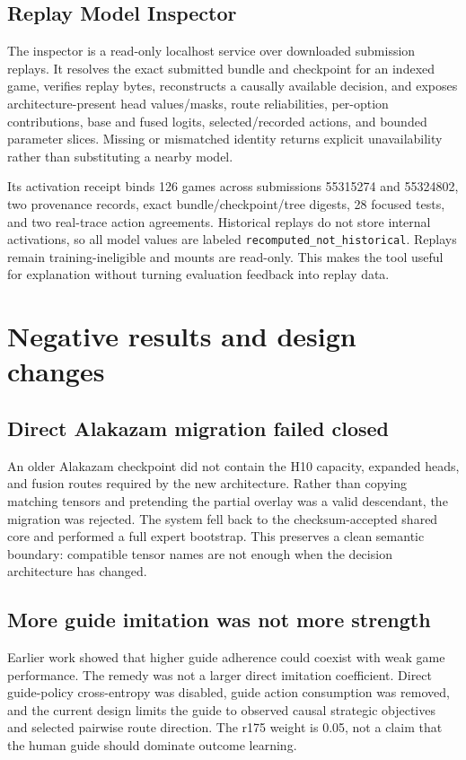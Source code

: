 \documentclass[10pt]{article}
\begin{document}
\subsection{Replay Model Inspector}

The inspector is a read-only localhost service over downloaded submission replays. It resolves the exact submitted bundle and checkpoint for an indexed game, verifies replay bytes, reconstructs a causally available decision, and exposes architecture-present head values/masks, route reliabilities, per-option contributions, base and fused logits, selected/recorded actions, and bounded parameter slices. Missing or mismatched identity returns explicit unavailability rather than substituting a nearby model.

Its activation receipt binds 126 games across submissions 55315274 and 55324802, two provenance records, exact bundle/checkpoint/tree digests, 28 focused tests, and two real-trace action agreements. Historical replays do not store internal activations, so all model values are labeled \texttt{recomputed\_not\_historical}. Replays remain training-ineligible and mounts are read-only. This makes the tool useful for explanation without turning evaluation feedback into replay data.

\section{Negative results and design changes}

\subsection{Direct Alakazam migration failed closed}

An older Alakazam checkpoint did not contain the H10 capacity, expanded heads, and fusion routes required by the new architecture. Rather than copying matching tensors and pretending the partial overlay was a valid descendant, the migration was rejected. The system fell back to the checksum-accepted shared core and performed a full expert bootstrap. This preserves a clean semantic boundary: compatible tensor names are not enough when the decision architecture has changed.

\subsection{More guide imitation was not more strength}

Earlier work showed that higher guide adherence could coexist with weak game performance. The remedy was not a larger direct imitation coefficient. Direct guide-policy cross-entropy was disabled, guide action consumption was removed, and the current design limits the guide to observed causal strategic objectives and selected pairwise route direction. The r175 weight is 0.05, not a claim that the human guide should dominate outcome learning.
\end{document}
